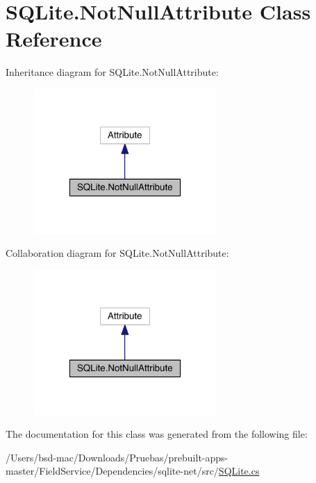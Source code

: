 \hypertarget{class_s_q_lite_1_1_not_null_attribute}{\section{S\+Q\+Lite.\+Not\+Null\+Attribute Class Reference}
\label{class_s_q_lite_1_1_not_null_attribute}
}


Inheritance diagram for S\+Q\+Lite.\+Not\+Null\+Attribute\+:
\nopagebreak
\begin{figure}[H]
\begin{center}
\leavevmode
\includegraphics[width=198pt]{class_s_q_lite_1_1_not_null_attribute__inherit__graph}
\end{center}
\end{figure}


Collaboration diagram for S\+Q\+Lite.\+Not\+Null\+Attribute\+:
\nopagebreak
\begin{figure}[H]
\begin{center}
\leavevmode
\includegraphics[width=198pt]{class_s_q_lite_1_1_not_null_attribute__coll__graph}
\end{center}
\end{figure}


The documentation for this class was generated from the following file\+:\begin{DoxyCompactItemize}
\item 
/\+Users/bsd-\/mac/\+Downloads/\+Pruebas/prebuilt-\/apps-\/master/\+Field\+Service/\+Dependencies/sqlite-\/net/src/\hyperlink{_s_q_lite_8cs}{S\+Q\+Lite.\+cs}\end{DoxyCompactItemize}
